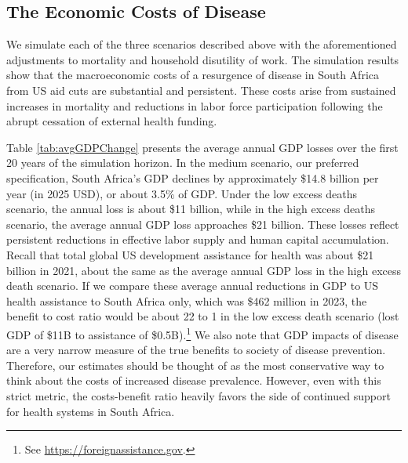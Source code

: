 \documentclass[letterpaper,12pt]{article}
\theoremstyle{definition}
\begin{document}
\begin{spacing}{1.5}


\section{The Economic Costs of Disease}\label{SecResults}

We simulate each of the three scenarios described above with the aforementioned adjustments to mortality and household disutility of work. The simulation results show that the macroeconomic costs of a resurgence of disease in South Africa from US aid cuts are substantial and persistent. These costs arise from sustained increases in mortality and reductions in labor force participation following the abrupt cessation of external health funding.

Table \ref{tab:avgGDPChange} presents the average annual GDP losses over the first 20 years of the simulation horizon. In the medium scenario, our preferred specification, South Africa's GDP declines by approximately \$14.8 billion per year (in 2025 USD), or about 3.5\% of GDP. Under the low excess deaths scenario, the annual loss is about \$11 billion, while in the high excess deaths scenario, the average annual GDP loss approaches \$21 billion. These losses reflect persistent reductions in effective labor supply and human capital accumulation. Recall that total global US development assistance for health was about \$21 billion in 2021, about the same as the average annual GDP loss in the high excess death scenario. If we compare these average annual reductions in GDP to US health assistance to South Africa only, which was \$462 million in 2023, the benefit to cost ratio would be about 22 to 1 in the low excess death scenario (lost GDP of \$11B to assistance of \$0.5B).\footnote{See \href{https://foreignassistance.gov}{https://foreignassistance.gov}.} We also note that GDP impacts of disease are a very narrow measure of the true benefits to society of disease prevention.  Therefore, our estimates should be thought of as the most conservative way to think about the costs of increased disease prevalence. However, even with this strict metric, the costs-benefit ratio heavily favors the side of continued support for health systems in South Africa.


\end{spacing}
\end{document}
